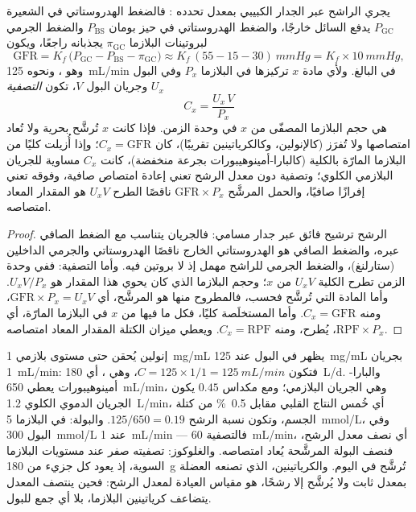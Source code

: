\begin{theorem}\label{thm:b3:renal-osmoregulation:clearance}
يجري الراشح عبر الجدار الكبيبي بمعدل تحدده \emph{}: فالضغط الهدروستاتي في الشعيرة $P_{\text{GC}}$ يدفع
السائل خارجًا، والضغط الهدروستاتي في حيز بومان
$P_{\text{BS}}$ والضغط الجرمي لبروتينات البلازما
$\pi_{\text{GC}}$ يجذبانه راجعًا، ويكون
\[
\text{GFR} = K_{f}\,\bigl(P_{\text{GC}} - P_{\text{BS}} - \pi_{\text{GC}}\bigr)
\approx K_{f}\,(55 - 15 - 30)\ \unit{mmHg} = K_{f}\times \qty{10}{mmHg},
\]
وهو \emph{}، ونحوه \qty{125}{mL/min} في
البالغ. ولأي مادة $x$ تركيزها في البلازما $P_{x}$ وفي البول
$U_{x}$ وجريان البول $V$، تكون \emph{التصفية}
\[
C_{x} = \frac{U_{x}\,V}{P_{x}}
\]
هي حجم البلازما المصفّى من $x$ في وحدة الزمن. فإذا كانت $x$
تُرشَّح بحرية ولا تُعاد امتصاصها ولا تُفرَز (كالإنولين،
وكالكرياتينين تقريبًا)، كان $C_{x} = \text{GFR}$؛ وإذا
أُزيلت كليًا من البلازما المارّة بالكلية (كالبارا-أمينوهيبورات
بجرعة منخفضة)، كانت $C_{x}$
مساوية للجريان البلازمي الكلوي؛ وتصفية دون معدل الرشح تعني
إعادة امتصاص صافية، وفوقه تعني إفرازًا صافيًا، والحمل
المرشَّح $\text{GFR}
\times P_{x}$ ناقصًا الطرح $U_{x}V$ هو المقدار المعاد امتصاصه.
\end{theorem}
\begin{proof}
الرشح ترشيح فائق عبر جدار مسامي: فالجريان يتناسب مع الضغط
الصافي عبره، والضغط الصافي هو الهدروستاتي الخارج ناقصًا
الهدروستاتي والجرمي الداخلين (ستارلنغ)، والضغط الجرمي
للراشح مهمل إذ لا بروتين فيه. وأما التصفية: ففي وحدة الزمن
تطرح الكلية $U_{x}V$ من $x$؛ وحجم البلازما الذي كان يحوي هذا
المقدار هو $U_{x}V/P_{x}$. وأما المادة التي تُرشَّح فحسب،
فالمطروح منها هو المرشَّح، أي $\text{GFR}\times P_{x} = U_{x}V$،
ومنه $C_{x} = \text{GFR}$. وأما المستخلَصة كليًا، فكل ما فيها
من $x$ في البلازما المارّة، أي $\text{RPF}\times P_{x}$، يُطرح،
ومنه $C_{x} = \text{RPF}$. ويعطي ميزان الكتلة المقدار المعاد امتصاصه.
\end{proof}

\begin{example}\label{ex:b3:renal-osmoregulation:numbers}
إنولين يُحقن حتى مستوى بلازمي \qty{1}{mg/mL} يظهر في البول عند
\qty{125}{mg/mL} بجريان \qty{1}{mL/min}: فتكون $C = 125\times 1/1 =
\qty{125}{mL/min}$، وهي ، أي \qty{180}{L/d}.
والبارا-أمينوهيبورات يعطي \qty{650}{mL/min}، وهي الجريان
البلازمي؛ ومع مكداس $0.45$ يكون الجريان الدموي الكلوي
\qty{1.2}{L/min}، أي خُمس النتاج القلبي مقابل \qty{0.5}{\%}
من كتلة الجسم، وتكون نسبة الرشح
$125/650 = 0.19$. والبولة: في البلازما \qty{5}{mmol/L}، وفي البول \qty{300}{mmol/L}
عند \qty{1}{mL/min} --- فالتصفية \qty{60}{mL/min}، أي نصف معدل
الرشح، فنصف البولة المرشَّحة يُعاد امتصاصه. والغلوكوز: تصفيته
صفر عند مستويات البلازما السوية، إذ يعود كل جزيء من
\qty{180}{g} تُرشَّح في اليوم. والكرياتينين، الذي تصنعه العضلة
بمعدل ثابت ولا يُرشَّح إلا رشحًا، هو مقياس العيادة لمعدل
الرشح: فحين ينتصف المعدل يتضاعف كرياتينين البلازما، بلا أي
جمع للبول.
\end{example}

